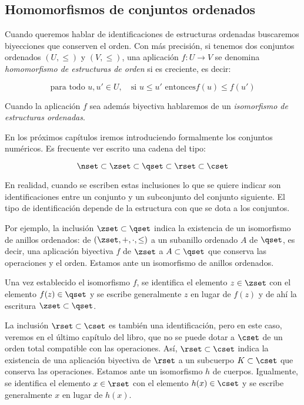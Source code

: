 \subsection{Homomorfismos de conjuntos ordenados}

Cuando queremos hablar de identificaciones de estructuras ordenadas
buscaremos biyecciones que conserven el orden. Con más precisión, si tenemos
dos conjuntos ordenados $(U, \leq)$ y $(V, \leq)$, una aplicación $f: U
\longrightarrow V$ se denomina \emph{homomorfismo de estructuras de orden}
si es creciente, es decir:

$$ \text{para todo } u, u' \in U, \quad \text{si } u \leq u' \text{ entonces
} f(u) \leq f(u') $$

Cuando la aplicación $f$ sea además biyectiva hablaremos de un
\emph{isomorfismo de estructuras ordenadas}.

En los próximos capítulos iremos introduciendo formalmente los conjuntos
numéricos. Es frecuente ver escrito una cadena del tipo:

$$ \nset \subset \zset \subset \qset \subset \rset \subset \cset $$

En realidad, cuando se escriben estas inclusiones lo que se quiere indicar
son identificaciones entre un conjunto y un subconjunto del conjunto
siguiente. El tipo de identificación depende de la estructura con que se
dota a los conjuntos.

Por ejemplo, la inclusión $\zset \subset \qset$ indica la existencia de un
isomorfismo de anillos ordenados: de $(\zset, +, \cdot, \leq)$ a un
subanillo ordenado $A$ de $\qset$, es decir, una aplicación biyectiva $f$ de
$\zset$ a $A \subset \qset$ que conserva las operaciones y el orden. Estamos
ante un isomorfismo de anillos ordenados. 

Una vez establecido el isomorfismo $f$, se identifica el elemento $z \in
\zset$ con el elemento $f(z) \in \qset$ y se escribe generalmente $z$ en
lugar de $f(z)$ y de ahí la escritura $\zset \subset \qset$.

La inclusión $\rset \subset \cset$ es también una identificación, pero en
este caso, veremos en el último capítulo del libro, que no se puede dotar a
$\cset$ de un orden total compatible con las operaciones. Así, $\rset
\subset \cset$ indica la existencia de una aplicación biyectiva de $\rset$ a
un subcuerpo $K \subset \cset$ que conserva las operaciones. Estamos ante un
isomorfismo $h$ de cuerpos. Igualmente, se identifica el elemento $x \in
\rset$ con el elemento $h(x) \in \cset$ y se escribe generalmente $x$ en
lugar de $h(x)$.









